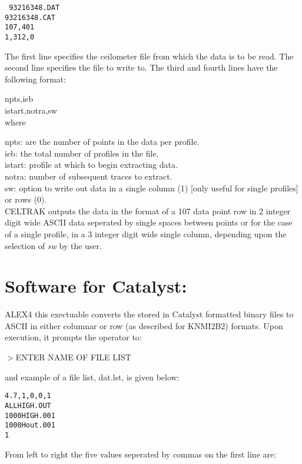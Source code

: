 \noindent
{\tt
93216348.DAT\\
93216348.CAT\\
107,401\\
1,312,0\\
}


The first line specifies the ceilometer file from which the data
is to be read. The second line specifies the file to write to.
The third and fourth lines have the following format:

\noindent
npts,ieb\\
istart,notra,sw\\

\noindent
where

\noindent
npts: are the number of points in the data per profile.\\ 
ieb: the total number of profiles in the file.\\
istart: profile at which to begin extracting data.\\
notra: number of subsequent traces to extract.\\
sw: option to write out data in a single column (1) [only useful for
    single profiles] or rows (0).\\

CELTRAK outputs the data in the format of a 107 data point row in 
2 integer digit wide ASCII data seperated by single spaces between
points or for the case of a single profile, in a 3 integer digit
wide single column, depending upon the selection of {\em sw} by the user.

\section{Software for Catalyst:}

ALEX4 this exectuable converts the stored in Catalyst formatted binary 
files to ASCII in either columnar or row (as described for KNMI2B2)
formats. Upon execution, it prompts the operator to:

\begin{center}
	$>$ENTER NAME OF FILE LIST
\end{center}
\noindent
and example of a file list, dat.lst, is given below:

\noindent
{\tt 4.7,1,0,0,1\\
ALLHIGH.OUT\\
1000HIGH.001\\
1000Hout.001\\
1}

\noindent
From left to right the five values seperated by commas 
on the first line are:

